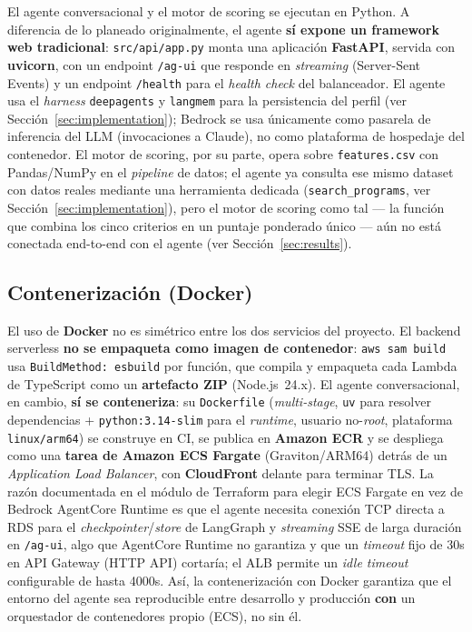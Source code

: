 El agente conversacional y el motor de scoring se ejecutan en Python. A
diferencia de lo planeado originalmente, el agente \textbf{s\'i expone un
framework web tradicional}: \texttt{src/api/app.py} monta una aplicaci\'on
\textbf{FastAPI}, servida con \textbf{uvicorn}, con un endpoint
\texttt{/ag-ui} que responde en \emph{streaming} (Server-Sent Events) y un
endpoint \texttt{/health} para el \emph{health check} del balanceador. El
agente usa el \emph{harness} \texttt{deepagents} y \texttt{langmem} para la
persistencia del perfil (ver Secci\'on~\ref{sec:implementation}); Bedrock se
usa \'unicamente como pasarela de inferencia del LLM (invocaciones a Claude),
no como plataforma de hospedaje del contenedor. El motor de scoring, por su
parte, opera sobre \texttt{features.csv} con Pandas/NumPy en el
\emph{pipeline} de datos; el agente ya consulta ese mismo dataset con datos
reales mediante una herramienta dedicada (\texttt{search\_programs}, ver
Secci\'on~\ref{sec:implementation}), pero el motor de scoring como tal
--- la funci\'on que combina los cinco criterios en un puntaje ponderado
\'unico --- a\'un no est\'a conectada end-to-end con el agente (ver
Secci\'on~\ref{sec:results}).

\subsection{Contenerizaci\'on (Docker)}

El uso de \textbf{Docker} no es sim\'etrico entre los dos servicios del
proyecto. El backend serverless \textbf{no se empaqueta como imagen de
contenedor}: \texttt{aws sam build} usa \texttt{BuildMethod: esbuild} por
funci\'on, que compila y empaqueta cada Lambda de TypeScript como un
\textbf{artefacto ZIP} (Node.js~24.x). El agente conversacional, en cambio,
\textbf{s\'i se conteneriza}: su \texttt{Dockerfile} (\emph{multi-stage},
\texttt{uv} para resolver dependencias + \texttt{python:3.14-slim} para el
\emph{runtime}, usuario no-\emph{root}, plataforma \texttt{linux/arm64}) se
construye en CI, se publica en \textbf{Amazon ECR} y se despliega como una
\textbf{tarea de Amazon ECS Fargate} (Graviton/ARM64) detr\'as de un
\emph{Application Load Balancer}, con \textbf{CloudFront} delante para
terminar TLS. La raz\'on documentada en el m\'odulo de Terraform para elegir
ECS Fargate en vez de Bedrock AgentCore Runtime es que el agente necesita
conexi\'on TCP directa a RDS para el \emph{checkpointer}/\emph{store} de
LangGraph y \emph{streaming} SSE de larga duraci\'on en \texttt{/ag-ui}, algo
que AgentCore Runtime no garantiza y que un \emph{timeout} fijo de 30s en
API Gateway (HTTP API) cortar\'ia; el ALB permite un \emph{idle timeout}
configurable de hasta 4000s. As\'i, la contenerizaci\'on con Docker
garantiza que el entorno del agente sea reproducible entre desarrollo y
producci\'on \textbf{con} un orquestador de contenedores propio (ECS), no
sin \'el.

